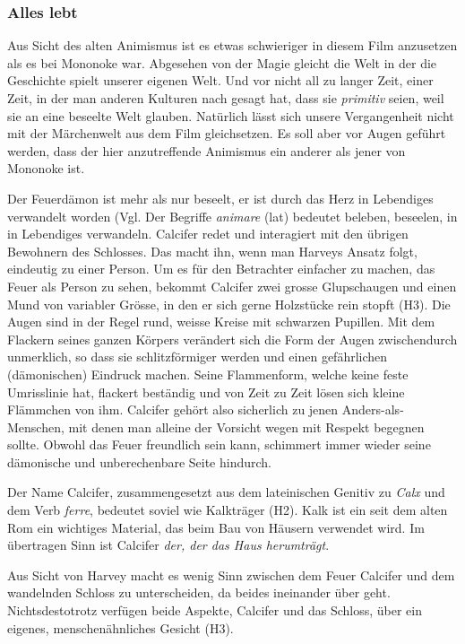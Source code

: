 \subsubsection{Alles lebt} 
Aus Sicht des alten Animismus ist es etwas schwieriger in diesem Film anzusetzen als es bei Mononoke war. Abgesehen von der Magie gleicht die Welt in der die Geschichte spielt unserer eigenen Welt. Und vor nicht all zu langer Zeit, einer Zeit, in der man anderen Kulturen nach gesagt hat, dass sie \emph{primitiv} seien, weil sie an eine beseelte Welt glauben. Natürlich lässt sich unsere Vergangenheit nicht mit der Märchenwelt aus dem Film gleichsetzen. Es soll aber vor Augen geführt werden, dass der hier anzutreffende Animismus ein anderer als jener von Mononoke ist. 

Der Feuerdämon ist mehr als nur beseelt, er ist durch das Herz in Lebendiges verwandelt worden (Vgl. Der Begriffe \emph{animare} (lat) bedeutet beleben, beseelen, in in Lebendiges verwandeln. Calcifer redet und interagiert mit den übrigen Bewohnern des Schlosses. Das macht ihn, wenn man Harveys Ansatz folgt, eindeutig zu einer Person. Um es für den Betrachter einfacher zu machen, das Feuer als Person zu sehen, bekommt Calcifer zwei grosse Glupschaugen und einen Mund von variabler Grösse, in den er sich gerne Holzstücke rein stopft (H3). Die Augen sind in der Regel rund, weisse Kreise mit schwarzen Pupillen. Mit dem Flackern seines ganzen Körpers verändert sich die Form der Augen zwischendurch unmerklich, so dass sie schlitzförmiger werden und einen gefährlichen (dämonischen) Eindruck machen. Seine Flammenform, welche keine feste Umrisslinie hat, flackert beständig und von Zeit zu Zeit lösen sich kleine Flämmchen von ihm. Calcifer gehört also sicherlich zu jenen Anders-als-Menschen, mit denen man alleine der Vorsicht wegen mit Respekt begegnen sollte. Obwohl das Feuer freundlich sein kann, schimmert immer wieder seine dämonische und unberechenbare Seite hindurch. 

Der Name Calcifer, zusammengesetzt aus dem lateinischen Genitiv zu \emph{Calx} und dem Verb \emph{ferre}, bedeutet soviel wie Kalkträger (H2). Kalk ist ein seit dem alten Rom ein wichtiges Material, das beim Bau von Häusern verwendet wird. Im übertragen Sinn ist Calcifer \emph{der, der das Haus herumträgt}.

Aus Sicht von Harvey macht es wenig Sinn zwischen dem Feuer Calcifer und dem wandelnden Schloss zu unterscheiden, da beides ineinander über geht. Nichtsdestotrotz verfügen beide Aspekte, Calcifer und 
das Schloss, über ein eigenes, menschenähnliches Gesicht (H3).

